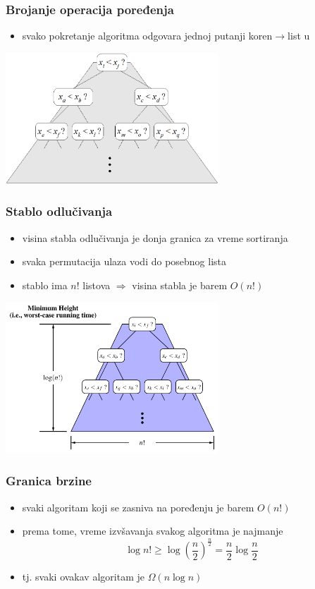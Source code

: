\documentclass[compress]{beamer}
\begin{document}
\begin{frame}[fragile]
  \frametitle{Brojanje operacija poređenja}
  \begin{itemize}
    \item svako pokretanje algoritma odgovara jednoj putanji koren$\rightarrow$list u 
  \end{itemize}
  \begin{center}
    \includegraphics[width=8cm]{asp-12-pic29.png}
  \end{center}
\end{frame}

\begin{frame}[fragile]
  \frametitle{Stablo odlučivanja}
  \begin{itemize}
    \item visina stabla odlučivanja je donja granica za vreme sortiranja
    \item svaka permutacija ulaza vodi do posebnog lista
    \item stablo ima $n!$ listova $\Rightarrow$ visina stabla je barem $O(n!)$
  \end{itemize}
  \begin{center}
    \includegraphics[width=8cm]{asp-12-pic30.pdf}
  \end{center}
\end{frame}

\begin{frame}[fragile]
  \frametitle{Granica brzine}
  \begin{itemize}
    \item svaki algoritam koji se zasniva na poređenju je barem $O(n!)$
    \item prema tome, vreme izvšavanja svakog algoritma je najmanje
    $$\log n! \geq \log \left(\frac{n}{2}\right)^{\frac{n}{2}} = \frac{n}{2}\log\frac{n}{2}$$
    \item tj. svaki ovakav algoritam je $\Omega(n\log n)$
  \end{itemize}
\end{frame}
\end{document}
